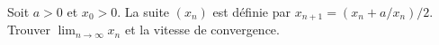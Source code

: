 Soit $a > 0$ et $x_0 > 0$. La suite $(x_n)$ est définie par $x_{n+1} = (x_n + a/x_n)/2$. Trouver $\lim_{n\to\infty} x_n$ et la vitesse de convergence.
